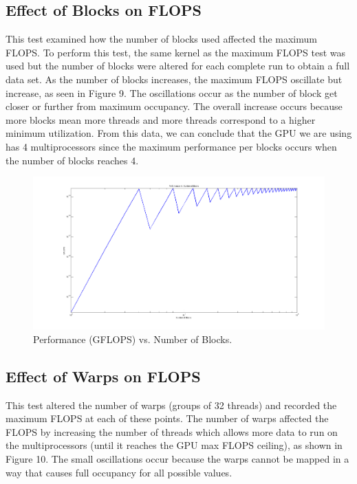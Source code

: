 \documentclass[12pt] {article}
\begin{document}
\subsection{Effect of Blocks on FLOPS}
This test examined how the number of blocks used affected the maximum FLOPS. To perform this test, the same kernel as the maximum FLOPS test was used but the number of blocks were altered for each complete run to obtain a full data set. As the number of blocks increases, the maximum FLOPS oscillate but increase, as seen in Figure 9. The oscillations occur as the number of block get closer or further from maximum occupancy. The overall increase occurs because more blocks mean more threads and more threads correspond to a higher minimum utilization. From this data, we can conclude that the GPU we are using has 4 multiprocessors since the maximum performance per blocks occurs when the number of blocks reaches 4.


\begin{figure}[ht!]
	\centering
	\includegraphics[width=5in]{figures/blocks_v_perf.png}
	\caption{Performance (GFLOPS) vs. Number of Blocks.}
\end{figure}
\FloatBarrier

\newpage
\subsection{Effect of Warps on FLOPS}
This test altered the number of warps (groups of 32 threads) and recorded the maximum FLOPS at each of these points. The number of warps affected the FLOPS by increasing the number of threads which allows more data to run on the multiprocessors (until it reaches the GPU max FLOPS ceiling), as shown in Figure 10. The small oscillations occur because the warps cannot be mapped in a way that causes full occupancy for all possible values.
\end{document}
